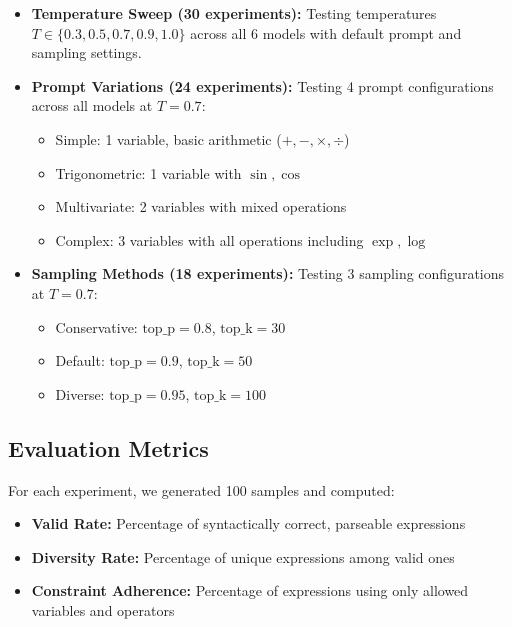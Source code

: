 \documentclass[11pt,a4paper]{article}
\begin{document}
\begin{itemize}
    \item \textbf{Temperature Sweep (30 experiments):} Testing temperatures $T \in \{0.3, 0.5, 0.7, 0.9, 1.0\}$ across all 6 models with default prompt and sampling settings.

    \item \textbf{Prompt Variations (24 experiments):} Testing 4 prompt configurations across all models at $T=0.7$:
    \begin{itemize}
        \item Simple: 1 variable, basic arithmetic ($+, -, \times, \div$)
        \item Trigonometric: 1 variable with $\sin, \cos$
        \item Multivariate: 2 variables with mixed operations
        \item Complex: 3 variables with all operations including $\exp, \log$
    \end{itemize}

    \item \textbf{Sampling Methods (18 experiments):} Testing 3 sampling configurations at $T=0.7$:
    \begin{itemize}
        \item Conservative: $\text{top\_p}=0.8$, $\text{top\_k}=30$
        \item Default: $\text{top\_p}=0.9$, $\text{top\_k}=50$
        \item Diverse: $\text{top\_p}=0.95$, $\text{top\_k}=100$
    \end{itemize}
\end{itemize}

\subsection{Evaluation Metrics}

For each experiment, we generated 100 samples and computed:

\begin{itemize}
    \item \textbf{Valid Rate:} Percentage of syntactically correct, parseable expressions
    \item \textbf{Diversity Rate:} Percentage of unique expressions among valid ones
    \item \textbf{Constraint Adherence:} Percentage of expressions using only allowed variables and operators
\end{itemize}
\end{document}
